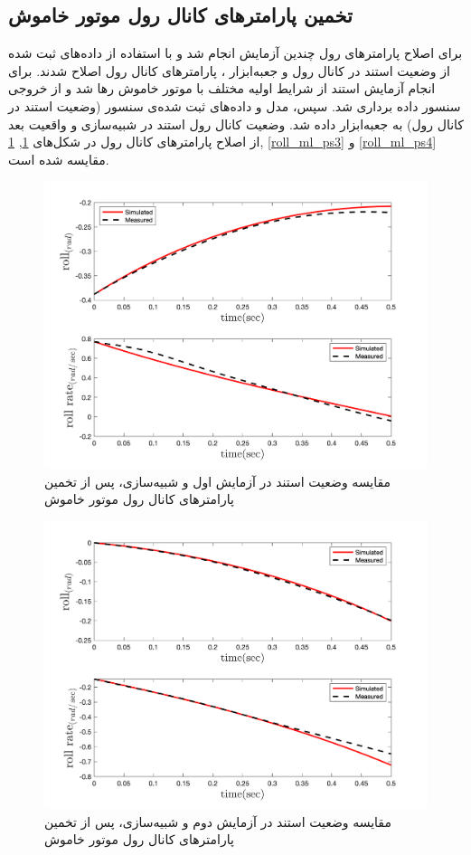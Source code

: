 \subsection{تخمین پارامترهای کانال رول موتور خاموش}
برای اصلاح پارامترهای رول چندین آزمایش انجام شد و با استفاده از داده‌های ثبت شده از وضعیت استند در کانال رول و جعبه‌ابزار
،
پارامترهای کانال رول اصلاح شدند.
برای انجام آزمایش استند از شرایط اولیه مختلف با موتور خاموش رها شد  و از خروجی سنسور داده برداری شد. سپس، مدل و داده‌های ثبت شده‌ی سنسور (وضعیت استند در کانال رول) به جعبه‌ابزار
داده شد. وضعیت کانال رول استند در شبیه‌سازی و واقعیت بعد از اصلاح پارامترهای کانال رول در شکل‌های
\ref{roll_ml_ps1}, \ref{roll_ml_ps1}, \ref{roll_ml_ps3} و \ref{roll_ml_ps4}
مقایسه شده است.

\begin{figure}[H]
	\includegraphics[width=12cm]{../../Figures/RCP/roll_ml_parameter_estimation/RCP_roll_S1.png}
	\centering
	\caption{مقايسه وضعیت استند در  آزمايش اول و شبیه‌سازی، پس از تخمین پارامترهای کانال رول موتور خاموش}
	\label{roll_ml_ps1}
\end{figure}
\begin{figure}[H]
	\includegraphics[width=12cm]{../../Figures/RCP/roll_ml_parameter_estimation/RCP_roll_S2.png}
	\centering
	\caption{مقايسه وضعیت استند در  آزمايش دوم و شبیه‌سازی، پس از تخمین پارامترهای کانال رول موتور خاموش}
	\label{roll_ml_ps2}
\end{figure}
